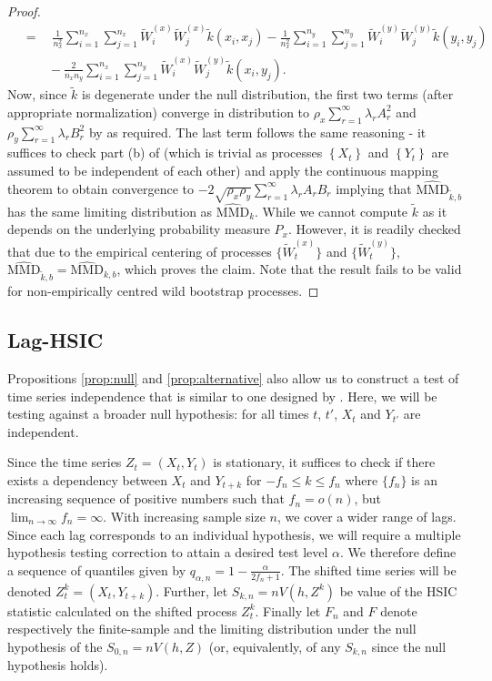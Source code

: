 \documentclass{article} %
\begin{document}
\begin{proof}
\begin{align*}
{}&=\quad\frac{1}{n_x^2}\sum_{i=1}^{n_x}\sum_{j=1}^{n_x}\tilde W_i^{(x)}\tilde W_j^{(x)}\tilde k(x_i,x_j)-\frac{1}{n_x^2}\sum_{i=1}^{n_y}\sum_{j=1}^{n_y}\tilde W_i^{(y)}\tilde W_j^{(y)}\tilde k(y_i,y_j)\\
{}&\qquad-\frac{2}{n_x n_y}\sum_{i=1}^{n_x}\sum_{j=1}^{n_y}\tilde W_i^{(x)}\tilde W_j^{(y)}\tilde k(x_i,y_j). 
\end{align*}
Now, since $\tilde k$ is degenerate under the null distribution, the first two terms (after appropriate normalization) converge in distribution to $\rho_x\sum_{r=1}^\infty \lambda_r A_r^2$ and  $\rho_y\sum_{r=1}^\infty \lambda_r B_r^2$ by \cite[Theorem 3.1]{leucht_dependent_2013} as required. The last term follows the same reasoning - it suffices to check part (b) of \cite[Theorem 3.1]{leucht_dependent_2013} (which is trivial as processes $\left\{ X_t \right\}$ and $\left\{ Y_t \right\}$ are assumed to be independent of each other) and apply the continuous mapping theorem to obtain convergence to $-2\sqrt{\rho_x\rho_y}\sum_{r=1}^\infty \lambda_r A_rB_r$ implying that $\widehat{\text{MMD}}_{\tilde k, b}$ has the same limiting distribution as $\widehat{\text{MMD}}_{k}$.
While we cannot compute $\tilde k$ as it depends on the underlying probability measure $P_x$. However, it is readily checked that due to the empirical centering of processes $\{\tilde W_t^{(x)}\}$ and $\{\tilde W_t^{(y)}\}$, $\widehat{\text{MMD}}_{\tilde k, b}=\widehat{\text{MMD}}_{k, b}$, which proves the claim. Note that the result fails to be valid for non-empirically centred wild bootstrap processes.
\end{proof}

\subsection{Lag-HSIC}


Propositions \ref{prop:null} and \ref{prop:alternative} also allow us to construct a test of time series independence that is similar to one designed by  \cite{besserve_statistical_2013}. Here, we will be testing against a broader null hypothesis: for all times $t$, $t'$, $X_t$ and $Y_{t'}$ are independent.

Since the time series $Z_t=(X_t,Y_t)$ is stationary, it suffices to check if there exists a dependency between $X_t$ and $Y_{t+k}$ for $-f_n \leq k \leq f_n$ where $\{f_n\}$ is an increasing sequence of positive numbers such that $f_n=o(n)$, but $\lim_{n\to\infty}f_n=\infty$. With increasing sample size $n$, we cover a wider range of lags. Since each lag corresponds to an individual hypothesis, we will require a multiple hypothesis testing correction to attain a desired test level $\alpha$. We therefore define a sequence of quantiles given by $q_{\alpha,n} = 1-\frac{\alpha}{2f_n+1}$. The shifted time series will be denoted $Z_t^k =(X_t,Y_{t+k})$. Further, let $S_{k,n}=n V(h,Z^k)$ be value of the HSIC statistic calculated on the shifted process $Z_t^k$. Finally let $F_n$ and $F$ denote respectively the finite-sample and the limiting distribution under the null hypothesis of the $S_{0,n} = n V(h,Z)$ (or, equivalently, of any $S_{k,n}$ since the null hypothesis holds).
\end{document}

